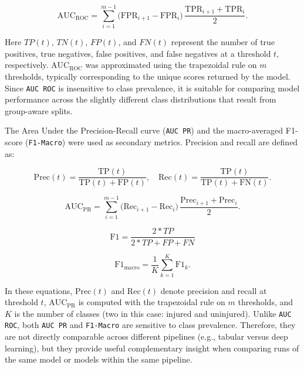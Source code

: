 \begin{equation}
    \mathrm{AUC}_{\mathrm{ROC}}
    = \sum_{i=1}^{m-1} \big(\mathrm{FPR}_{i+1}-\mathrm{FPR}_{i}\big)\,
    \frac{\mathrm{TPR}_{i+1}+\mathrm{TPR}_{i}}{2}.
\end{equation}

Here $TP(t)$, $TN(t)$, $FP(t)$, and $FN(t)$ represent the number of true positives, true negatives, false positives, and false negatives at a threshold $t$, respectively. $\mathrm{AUC}_{\mathrm{ROC}}$ was approximated using the trapezoidal rule on $m$ thresholds, typically corresponding to the unique scores returned by the model. Since \texttt{AUC ROC} is insensitive to class prevalence, it is suitable for comparing model performance across the slightly different class distributions that result from group-aware splits.

The Area Under the Precision-Recall curve (\texttt{AUC PR}) and the macro-averaged F1-score (\texttt{F1-Macro}) were used as secondary metrics. Precision and recall are defined as:

\begin{equation}
    \mathrm{Prec}(t)=\frac{\mathrm{TP}(t)}{\mathrm{TP}(t)+\mathrm{FP}(t)},\quad
    \mathrm{Rec}(t)=\frac{\mathrm{TP}(t)}{\mathrm{TP}(t)+\mathrm{FN}(t)}.
\end{equation}

\begin{equation}
    \mathrm{AUC}_{\mathrm{PR}}
    = \sum_{i=1}^{m-1} \big(\mathrm{Rec}_{i+1}-\mathrm{Rec}_i\big)\,\frac{\mathrm{Prec}_{i+1}+\mathrm{Prec}_i}{2}.
\end{equation}

\begin{equation}
    \mathrm{F1}=\frac{2 * TP}{2 * TP + FP + FN}
\end{equation}

\begin{equation}
    \mathrm{F1}_{\mathrm{macro}}=\frac{1}{K}\sum_{k=1}^{K}\mathrm{F1}_k.
\end{equation}

In these equations, $\mathrm{Prec}(t)$ and $\mathrm{Rec}(t)$ denote precision and recall at threshold $t$, $\mathrm{AUC}_{\mathrm{PR}}$ is computed with the trapezoidal rule on $m$ thresholds, and $K$ is the number of classes (two in this case: injured and uninjured). Unlike \texttt{AUC ROC}, both \texttt{AUC PR} and \texttt{F1-Macro} are sensitive to class prevalence. Therefore, they are not directly comparable across different pipelines (e.g., tabular versus deep learning), but they provide useful complementary insight when comparing runs of the same model or models within the same pipeline.

